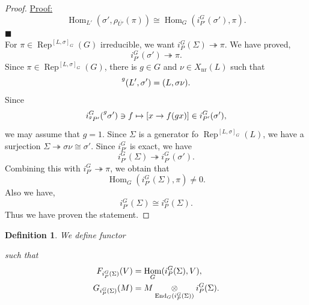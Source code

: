 \documentclass[8pt]{article}
\newenvironment{claimproof}[1]{\par\noindent\underline{Proof:}\space#1}{\hfill $\blacksquare$}
\newtheorem{definition}{Definition}[section]
\DeclareMathOperator{\Rep}{Rep}
\DeclareMathOperator{\Hom}{Hom}
\DeclareMathOperator{\End}{End}
\DeclareMathOperator{\Mod}{Mod}
\DeclareMathOperator{\nr}{nr}
\newcommand{\tens}[1]{%
  \mathbin{\mathop{\otimes}\displaylimits_{#1}}%
}
\begin{document}
\begin{proof}
\begin{claimproof}
\begin{equation*}
      \Hom_{L'}(\sigma',\rho_{\overline{U'}}(\pi)) \cong \Hom_G(i_{P'}^G(\sigma'),\pi).
    \end{equation*}
  \end{claimproof}\\
  For $\pi\in\Rep^{[L,\sigma]_G}(G)$ irreducible, we want $i_P^G(\Sigma)\twoheadrightarrow\pi$. We have proved,
  \begin{equation*}
    i_{P'}^G(\sigma')\twoheadrightarrow\pi.
  \end{equation*}
  Since $\pi\in\Rep^{[L,\sigma]_G}(G)$, there is $g\in G$ and $\nu\in X_{\nr}(L)$ such that 
  \begin{equation*}
    \prescript{g}{}{(L',\sigma')}=(L,\sigma\nu).
  \end{equation*}
  Since 
  \begin{equation*}
    i_{\prescript{g}{}{P'}}^G(\prescript{g}{}{\sigma'}) \ni f\mapsto [x\to f(gx)]\in i_{P'}^G(\sigma'),
  \end{equation*}
  we may assume that $g=1$. Since $\Sigma$ is a generator fo $\Rep^{[L,\sigma]_G}(L)$, we have a surjection $\Sigma\twoheadrightarrow\sigma\nu\cong\sigma'$. Since $i_{P'}^G$ is exact, we have 
  \begin{equation*}
    i_{P'}^G(\Sigma)\twoheadrightarrow i_{P'}^G(\sigma').
  \end{equation*}
  Combining this with $i_{P'}^G\twoheadrightarrow\pi$, we obtain that 
  \begin{equation*}
    \Hom_G(i_{P'}^G(\Sigma),\pi)\not=0.
  \end{equation*}
  Also we have,
  \begin{equation*}
    i_{P'}^G(\Sigma)\cong i_P^G(\Sigma).
  \end{equation*}
  Thus we have proven the statement. 
  \end{proof}
  \begin{definition}
    We define functor
    \begin{center}
    \end{center}
    such that 
    \begin{align*}
      F_{i_P^G(\Sigma)}(V) & = \Hom_G(i_P^G(\Sigma),V),\\
      G_{i_P^G(\Sigma)}(M) & = M\tens{\End_G(i_P^G(\Sigma))}i_P^G(\Sigma).
    \end{align*}
  \end{definition}
\end{document}
